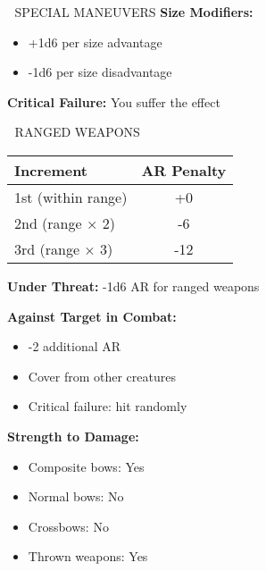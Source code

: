 \documentclass[10pt,a4paper,landscape]{article}
\begin{document}
\begin{multicols}{4}
\begin{mainsection}{🤺 SPECIAL MANEUVERS}
			\textbf{Size Modifiers:}
			\begin{itemize}[noitemsep,leftmargin=8pt]
				\item +1d6 per size advantage
				\item -1d6 per size disadvantage
			\end{itemize}

			\textbf{Critical Failure:} You suffer the effect
		\end{mainsection}

		\begin{mainsection}{🏹 RANGED WEAPONS}
			\begin{tabular}{@{}lc@{}}
				\toprule
				\textbf{Increment} & \textbf{AR Penalty} \\
				\midrule
				1st (within range) & +0 \\
				2nd (range × 2) & -6 \\
				3rd (range × 3) & -12 \\
				\bottomrule
			\end{tabular}
			\medskip
			\textbf{Under Threat:} -1d6 AR for ranged weapons

			\textbf{Against Target in Combat:}
			\begin{itemize}[noitemsep,leftmargin=8pt]
				\item -2 additional AR
				\item Cover from other creatures
				\item Critical failure: hit randomly
			\end{itemize}

			\textbf{Strength to Damage:}
			\begin{itemize}[noitemsep,leftmargin=8pt]
				\item Composite bows: Yes
				\item Normal bows: No
				\item Crossbows: No
				\item Thrown weapons: Yes
			\end{itemize}
		\end{mainsection}

		\columnbreak


\end{multicols}
\end{document}
